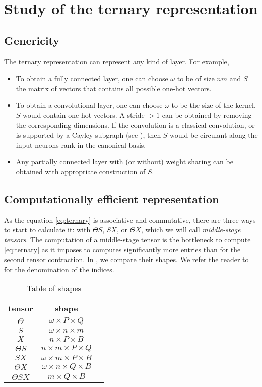 \section{Study of the ternary representation}

\subsection{Genericity}

The ternary representation can represent any kind of layer. For example,
\begin{itemize}
\item To obtain a fully connected layer, one can choose $\omega$ to be of size $nm$ and $S$ the matrix of vectors that contains all possible one-hot vectors.
\item To obtain a convolutional layer, one can choose $\omega$ to be the size of the kernel. $S$ would contain one-hot vectors. A stride $> 1$ can be obtained by removing the corresponding dimensions. If the convolution is a classical convolution, or is supported by a Cayley subgraph (see ), then $S$ would be circulant along the input neurons rank in the canonical basis.
\item Any partially connected layer with (or without) weight sharing can be obtained with appropriate construction of $S$.
\end{itemize}

\subsection{Computationally efficient representation}

As the equation \eqref{eq:ternary} is associative and commutative, there are three ways to start to calculate it: with $\Theta S$, $SX$, or $\Theta X$, which we will call \emph{middle-stage tensors}. The computation of a middle-stage tensor is the bottleneck to compute \eqref{eq:ternary} as it imposes to computes significantly more entries than for the second tensor contraction. In , we compare their shapes. We refer the reader to  for the denomination of the indices.

\begin{table}[H]
  \centering
\begin{tabular}{ccc}
  tensor & shape\\
  \hline
  $\Theta$ & $\omega \times P \times Q$\\
  $S$ & $\omega \times n \times m$\\
  $X$ & $n \times P \times B$\\
  $\Theta S$ & $n \times m \times P \times Q$\\
  $SX$ & $\omega \times m \times P \times B$\\
  $\Theta X$ & $\omega \times n \times Q \times B$\\
  $\Theta SX$ & $m \times Q \times B$
\end{tabular}
\caption{Table of shapes}
\label{tab:mid}
\end{table}

